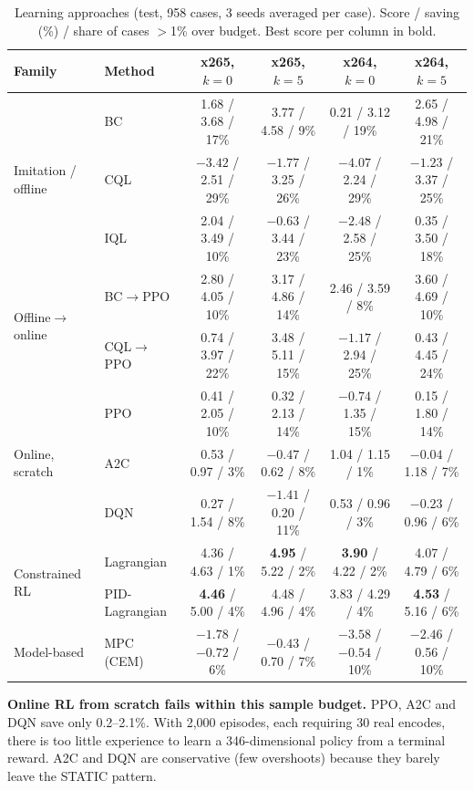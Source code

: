 \documentclass[conference]{IEEEtran}
\newcommand{\cqlppo}{CQL$\to$PPO}
\newcommand{\bcppo}{BC$\to$PPO}
\begin{document}
\begin{table}[t]
\centering\footnotesize
\caption{Learning approaches (test, 958 cases, 3 seeds averaged per case). Score / saving (\%) / share of cases $>$1\% over budget. Best score per column in bold.}
\label{tab:methods}
\begin{tabular}{@{}l l cccc@{}}
\toprule
Family & Method & x265, $k{=}0$ & x265, $k{=}5$ & x264, $k{=}0$ & x264, $k{=}5$\\
\midrule
\multirow{3}{*}{Imitation / offline} & BC & 1.68 / 3.68 / 17\% & 3.77 / 4.58 / 9\% & 0.21 / 3.12 / 19\% & 2.65 / 4.98 / 21\%\\
 & CQL & $-3.42$ / 2.51 / 29\% & $-1.77$ / 3.25 / 26\% & $-4.07$ / 2.24 / 29\% & $-1.23$ / 3.37 / 25\%\\
 & IQL & 2.04 / 3.49 / 10\% & $-0.63$ / 3.44 / 23\% & $-2.48$ / 2.58 / 25\% & 0.35 / 3.50 / 18\%\\
\midrule
\multirow{2}{*}{Offline$\to$online} & \bcppo & 2.80 / 4.05 / 10\% & 3.17 / 4.86 / 14\% & 2.46 / 3.59 / 8\% & 3.60 / 4.69 / 10\%\\
 & \cqlppo & 0.74 / 3.97 / 22\% & 3.48 / 5.11 / 15\% & $-1.17$ / 2.94 / 25\% & 0.43 / 4.45 / 24\%\\
\midrule
\multirow{3}{*}{Online, scratch} & PPO & 0.41 / 2.05 / 10\% & 0.32 / 2.13 / 14\% & $-0.74$ / 1.35 / 15\% & 0.15 / 1.80 / 14\%\\
 & A2C & 0.53 / 0.97 / 3\% & $-0.47$ / 0.62 / 8\% & 1.04 / 1.15 / 1\% & $-0.04$ / 1.18 / 7\%\\
 & DQN & 0.27 / 1.54 / 8\% & $-1.41$ / 0.20 / 11\% & 0.53 / 0.96 / 3\% & $-0.23$ / 0.96 / 6\%\\
\midrule
\multirow{2}{*}{Constrained RL} & Lagrangian & 4.36 / 4.63 / 1\% & \textbf{4.95} / 5.22 / 2\% & \textbf{3.90} / 4.22 / 2\% & 4.07 / 4.79 / 6\%\\
 & PID-Lagrangian & \textbf{4.46} / 5.00 / 4\% & 4.48 / 4.96 / 4\% & 3.83 / 4.29 / 4\% & \textbf{4.53} / 5.16 / 6\%\\
\midrule
Model-based & MPC (CEM) & $-1.78$ / $-0.72$ / 6\% & $-0.43$ / 0.70 / 7\% & $-3.58$ / $-0.54$ / 10\% & $-2.46$ / 0.56 / 10\%\\
\bottomrule
\end{tabular}
\end{table}

\textbf{Online RL from scratch fails within this sample budget.} PPO, A2C and DQN save only 0.2--2.1\%. With 2{,}000 episodes, each requiring 30 real encodes, there is too little experience to learn a 346-dimensional policy from a terminal reward. A2C and DQN are conservative (few overshoots) because they barely leave the STATIC pattern.
\end{document}

